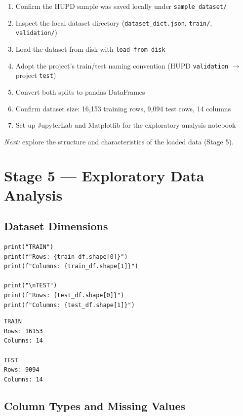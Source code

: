 \documentclass[11pt]{article}
\begin{document}
\begin{enumerate}
    \item Confirm the HUPD sample was saved locally under \texttt{sample\_dataset/}
    \item Inspect the local dataset directory (\texttt{dataset\_dict.json}, \texttt{train/}, \texttt{validation/})
    \item Load the dataset from disk with \texttt{load\_from\_disk}
    \item Adopt the project's train/test naming convention (HUPD \texttt{validation} $\rightarrow$ project \texttt{test})
    \item Convert both splits to pandas DataFrames
    \item Confirm dataset size: 16,153 training rows, 9,094 test rows, 14 columns
    \item Set up JupyterLab and Matplotlib for the exploratory analysis notebook
\end{enumerate}

\noindent \textit{Next:} explore the structure and characteristics of the loaded data (Stage 5).

\section{Stage 5 --- Exploratory Data Analysis}

\subsection{Dataset Dimensions}

\begin{lstlisting}
print("TRAIN")
print(f"Rows: {train_df.shape[0]}")
print(f"Columns: {train_df.shape[1]}")

print("\nTEST")
print(f"Rows: {test_df.shape[0]}")
print(f"Columns: {test_df.shape[1]}")
\end{lstlisting}

\begin{lstlisting}
TRAIN
Rows: 16153
Columns: 14

TEST
Rows: 9094
Columns: 14
\end{lstlisting}

\subsection{Column Types and Missing Values}
\end{document}
